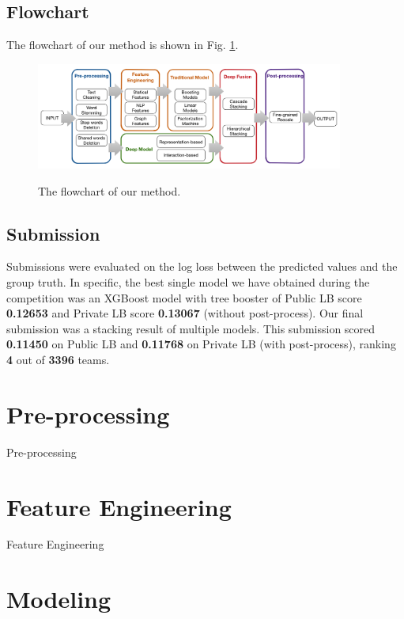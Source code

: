 \documentclass[12pt]{article}
\begin{document}
\subsection{Flowchart}

The flowchart of our method is shown in Fig. \ref{fig:Flowchart}.

\begin{figure}[ht]
  \centering
  \includegraphics[width=0.9\textwidth]{../img/flowchart}\\
  \caption{The flowchart of our method.}
  \label{fig:Flowchart}
\end{figure}

\subsection{Submission}
\label{subsec:Results_description}

Submissions were evaluated on the log loss between the predicted values and the group truth. In specific, the best single model we have obtained during the competition was an XGBoost model with tree booster of Public LB score \textbf{0.12653} and Private LB score \textbf{0.13067} (without post-process). Our final submission was a stacking result of multiple models. This submission scored \textbf{0.11450} on Public LB and \textbf{0.11768} on Private LB (with post-process), ranking \textbf{4} out of \textbf{3396} teams.

\section{Pre-processing}


Pre-processing

\section{Feature Engineering}

Feature Engineering  

\section{Modeling}
\end{document}
